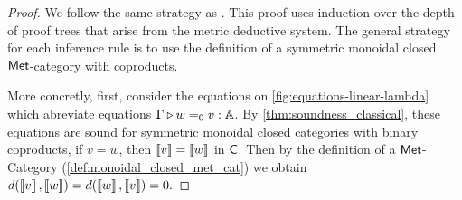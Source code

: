 \begin{proof}
  We follow the same strategy as \cite{dahlqvist2022syntactic}.
  This proof uses induction over the depth of proof trees that
  arise from the metric deductive system. The general strategy for each
  inference rule is to use the definition of a symmetric monoidal closed $\mathsf{Met}$-category with coproducts. 

   More concretly, first, consider the equations on \autoref{fig:equations-linear-lambda} which abreviate equations $\Gamma \triangleright w =_0 v : \mathbb{A}$. By \autoref{thm:soundness_classical}, these equations are sound for symmetric monoidal closed categories with binary coproducts, \ie if $v=w$, then $\left \llbracket v \right \rrbracket=\left \llbracket w \right \rrbracket$ in $ \mathsf{C}$. Then by the definition of a $\mathsf{Met}$-Category (\autoref{def:monoidal_closed_met_cat}) we obtain $d(\left \llbracket v \right \rrbracket,\left \llbracket w \right \rrbracket) = d(\left \llbracket w \right \rrbracket,\left \llbracket v \right \rrbracket)=0.$ 
 

\end{proof}
